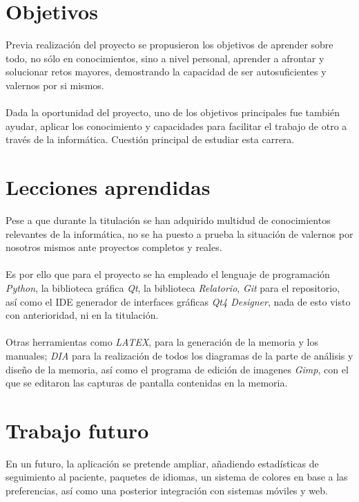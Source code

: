

\section{Objetivos}

Previa realización del proyecto se propusieron los objetivos de aprender sobre todo, no sólo en conocimientos, sino a nivel personal, aprender a afrontar y solucionar retos mayores, demostrando la capacidad de ser autosuficientes y valernos por si mismos.\\\\
Dada la oportunidad del proyecto, uno de los objetivos principales fue también ayudar, aplicar los conocimiento y capacidades para facilitar el trabajo de otro a través de la informática. Cuestión principal de estudiar esta carrera.

\section{Lecciones aprendidas}
Pese a que durante la titulación se han adquirido multidud de conocimientos relevantes de la informática, no se ha puesto a prueba la situación de valernos por nosotros mismos ante proyectos completos y reales.\\\\
Es por ello que para el proyecto se ha empleado el lenguaje de programación \textit{Python}, la biblioteca gráfica \textit{Qt}, la biblioteca \textit{Relatorio}, \textit{Git} para el repositorio, así como el IDE generador de interfaces gráficas \textit{Qt4 Designer}, nada de esto visto con anterioridad, ni en la titulación.\\\\
Otras herramientas como \textit{LATEX}, para la generación de la memoria y los manuales; \textit{DIA} para la realización de todos los diagramas de la parte de análisis y diseño de la memoria, así como el programa de edición de imagenes \textit{Gimp}, con el que se editaron las capturas de pantalla contenidas en la memoria.

\section{Trabajo futuro}
En un futuro, la aplicación se pretende ampliar, añadiendo estadísticas de seguimiento al paciente, paquetes de idiomas, un sistema de colores en base a las preferencias, así como una posterior integración con sistemas móviles y web.\\

